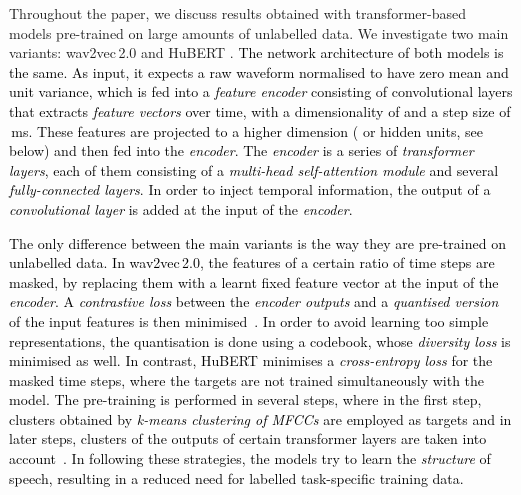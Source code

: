 \documentclass{article}
\newcommand{\review}[1]{\textcolor{black}{#1}}
\newcommand{\wtov}{wav2vec\,2.0}
\newcommand{\hubert}{HuBERT}
\begin{document}
Throughout the paper,
we discuss results obtained with transformer-based models
pre-trained on large amounts of unlabelled data. 
We investigate two main variants: {\wtov} \cite{baevski2020wav2vec} and {\hubert} \cite{hsu2021hubert}.
\review{The network architecture of both models is the same. As input, it expects a raw waveform 
normalised to have zero mean and unit variance, which is fed into a \emph{feature encoder} consisting of  convolutional layers that extracts \emph{feature vectors} over time, with a dimensionality of  and a step size of \,ms. These features are projected to a higher dimension ( or  hidden units, see below) and then fed into the \emph{encoder}. The \emph{encoder} is a series of \emph{transformer layers}, each of them consisting of a \emph{multi-head self-attention module} and several \emph{fully-connected layers}. In order to inject temporal information, the output of a \emph{convolutional layer} is added at the input of the \emph{encoder}.}

\review{The only difference between the main variants is the way they are pre-trained on unlabelled data.
In {\wtov}, the features of a certain ratio of time steps are masked, by replacing them with a learnt fixed feature vector at the input of the \emph{encoder}. A \emph{contrastive loss} between the \emph{encoder outputs} and a \emph{quantised version} of the input features is then minimised~\cite{baevski2020wav2vec}. In order to avoid learning too simple representations, the quantisation is done using a codebook, whose \emph{diversity loss} is minimised as well.}
\review{In contrast, {\hubert} minimises a \emph{cross-entropy loss} for the masked time steps, where the targets are not trained simultaneously with the model.
The pre-training is performed in several steps, where in the first step, clusters obtained by \emph{k-means clustering of MFCCs} are employed as targets and in later steps, clusters of the outputs of certain transformer layers are taken into account~\cite{hsu2021hubert}.
In following these strategies, the models try to learn the \emph{structure} of speech, resulting in a reduced need for labelled task-specific training data.}
\end{document}
